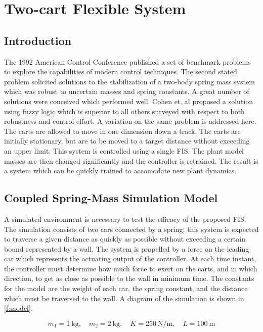\chapter{Two-cart Flexible System}\label{c:acc}
\section{Introduction}
The 1992 American Control Conference published a set of benchmark problems to explore the capabilities of
modern control techniques\cite{wie1992benchmark}. The second stated problem solicited solutions to the
stabilization of a two-body spring mass system which was robust to uncertain masses and spring constants. A
great number of solutions were conceived which performed well\cite{stengel1992robustness}. Cohen et. al
\cite{cohen:01jgcd} proposed a solution using fuzzy logic which is superior to all others surveyed with
respect to both robustness and control effort. A variation on the same problem is addressed here. The carts
are allowed to move in one dimension down a track. The carts are initially stationary, but are to be moved to
a target distance without exceeding an upper limit. This system is controlled using a single FIS. The plant
model masses are then changed significantly and the controller is retrained. The result is a system which can
be quickly trained to accomodate new plant dynamics.

\section{Coupled Spring-Mass Simulation Model}\label{s:model} A simulated environment is
necessary to test the efficacy of the proposed FIS. The simulation consists of two
cars connected by a spring; this system is expected to traverse a given distance as quickly as possible
without exceeding a certain bound represented by a wall. The system is propelled by a force on the leading car
which represents the actuating output of the controller. At each time instant, the controller must determine
how much force to exert on the carts, and in which direction, to get as close as possible to the wall in
minimum time. The constants for the model are the weight of each car, the spring constant, and the distance
which must be traversed to the wall. A diagram of the simulation is shown in \cref{f:model}.

\begin{displaymath}
    m_{1}=\SI{1}{\kilogram}, \quad m_{2}=\SI{2}{\kilogram}, \quad K =
\SI{250}{\newton\per\metre}, \quad L = \SI{100}{\metre}
\end{displaymath}

